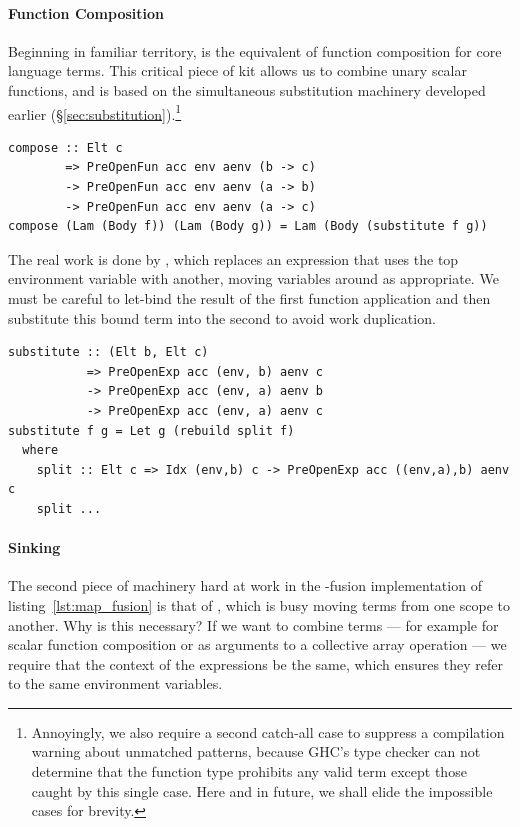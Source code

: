 \paragraph{Function Composition}

Beginning in familiar territory,  is the equivalent of function
composition  for core language terms. This critical piece of kit
allows us to combine unary scalar functions, and is based on the simultaneous
substitution machinery developed earlier
(\S\ref{sec:substitution}).\footnote{Annoyingly, we also require a second
catch-all case to suppress a compilation warning about unmatched patterns,
because GHC's type checker can not determine that the function type prohibits
any valid term except those caught by this single case. Here and in future, we
shall elide the impossible cases for brevity.}
%
\begin{lstlisting}[style=haskell]
compose :: Elt c
        => PreOpenFun acc env aenv (b -> c)
        -> PreOpenFun acc env aenv (a -> b)
        -> PreOpenFun acc env aenv (a -> c)
compose (Lam (Body f)) (Lam (Body g)) = Lam (Body (substitute f g))
\end{lstlisting}
%
The real work is done by , which replaces an expression that
uses the top environment variable with another, moving variables around as
appropriate. We must be careful to let-bind the result of the first
function application and then substitute this bound term into the second to
avoid work duplication.
%
\begin{lstlisting}[style=haskell]
substitute :: (Elt b, Elt c)
           => PreOpenExp acc (env, b) aenv c
           -> PreOpenExp acc (env, a) aenv b
           -> PreOpenExp acc (env, a) aenv c
substitute f g = Let g (rebuild split f)
  where
    split :: Elt c => Idx (env,b) c -> PreOpenExp acc ((env,a),b) aenv c
    split ...
\end{lstlisting}


\paragraph{Sinking}

The second piece of machinery hard at work in the -fusion
implementation of listing~\ref{lst:map_fusion} is that of , which
is busy moving terms from one scope to another. Why is this necessary? If we
want to combine terms --- for example for scalar function composition or as
arguments to a collective array operation --- we require that the context of the
expressions be the same, which ensures they refer to the same environment
variables.

